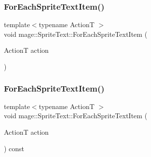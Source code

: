 \hypertarget{classmage_1_1_sprite_text_af1236ba7c80c61be058a21ef1d4c483d}{}\label{classmage_1_1_sprite_text_af1236ba7c80c61be058a21ef1d4c483d} 
\subsubsection{\texorpdfstring{For\+Each\+Sprite\+Text\+Item()}{ForEachSpriteTextItem()}\hspace{0.1cm}{\footnotesize\ttfamily [1/2]}}
{\footnotesize\ttfamily template$<$typename ActionT $>$ \\
void mage\+::\+Sprite\+Text\+::\+For\+Each\+Sprite\+Text\+Item (\begin{DoxyParamCaption}\item[{ActionT}]{action }\end{DoxyParamCaption})\hspace{0.3cm}{\ttfamily [protected]}}

\hypertarget{classmage_1_1_sprite_text_ab8576580e5b3c0bb568c1256a0b989bc}{}\label{classmage_1_1_sprite_text_ab8576580e5b3c0bb568c1256a0b989bc} 
\subsubsection{\texorpdfstring{For\+Each\+Sprite\+Text\+Item()}{ForEachSpriteTextItem()}\hspace{0.1cm}{\footnotesize\ttfamily [2/2]}}
{\footnotesize\ttfamily template$<$typename ActionT $>$ \\
void mage\+::\+Sprite\+Text\+::\+For\+Each\+Sprite\+Text\+Item (\begin{DoxyParamCaption}\item[{ActionT}]{action }\end{DoxyParamCaption}) const\hspace{0.3cm}{\ttfamily [protected]}}

\hypertarget{classmage_1_1_sprite_text_a1c80933525f87fe4dced9479c1b79764}{}\label{classmage_1_1_sprite_text_a1c80933525f87fe4dced9479c1b79764} 
